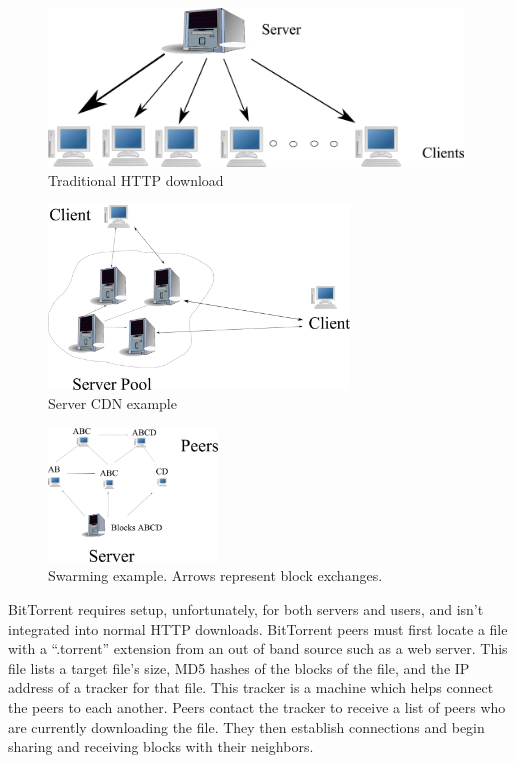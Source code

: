 \begin{figure}
\begin{center}
   \includegraphics[width=11cm]{description_pics/traditional_http.png}
    \caption{Traditional HTTP download}
 \label{fig:traditional_http}
 \end{center}
\end{figure}
\begin{figure}
    \centering
  \includegraphics[width=8cm]{description_pics/server_side_only.png}
  \caption{Server CDN example}
  \label{fig:server_only}
\end{figure}   
\begin{figure}
 \centering
 \includegraphics[width=4.5cm]{description_pics/normal_swarm.png}
 \caption{Swarming example.  Arrows represent block exchanges.}
 \label{fig:normal_swarm}
\end{figure}

BitTorrent requires setup, unfortunately, for both servers and users, and isn't integrated into normal HTTP downloads.  BitTorrent peers must first locate a file with a ``.torrent'' extension from an out of band source such as a web server.  This file lists a target file's size, MD5 hashes of the blocks of the file, and the IP address of a tracker for that file.  This tracker is a machine which helps connect the peers to each another.  Peers contact the tracker to receive a list of peers who are currently downloading the file.  They then establish connections and begin sharing and receiving blocks with their neighbors.

